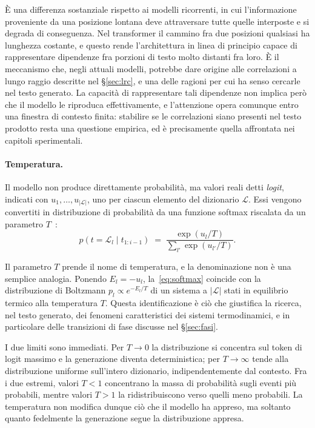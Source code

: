 È una differenza sostanziale rispetto ai modelli ricorrenti, in cui
l'informazione proveniente da una posizione lontana deve attraversare tutte
quelle interposte e si degrada di conseguenza. Nel transformer il cammino fra
due posizioni qualsiasi ha lunghezza costante, e questo rende l'architettura in
linea di principio capace di rappresentare dipendenze fra porzioni di testo
molto distanti fra loro. È il meccanismo che, negli attuali modelli, potrebbe
dare origine alle correlazioni a lungo raggio descritte nel §\ref{sec:lrc}, e
una delle ragioni per cui ha senso cercarle nel testo generato. La capacità di
rappresentare tali dipendenze non implica però che il modello le riproduca
effettivamente, e l'attenzione opera comunque entro una finestra di contesto
finita: stabilire se le correlazioni siano presenti nel
testo prodotto resta una questione empirica, ed è precisamente quella affrontata
nei capitoli sperimentali.

\paragraph{Temperatura.}
Il modello non produce direttamente probabilità, ma valori reali detti
\emph{logit}, indicati con $u_1,\dots,u_{|\mathcal{L}|}$, uno per ciascun
elemento del dizionario $\mathcal{L}$. Essi vengono convertiti in distribuzione
di probabilità da una funzione softmax riscalata da un parametro
$T$~\cite{ackley1985}:
\begin{equation}
  p(t = \mathcal{L}_l \mid t_{1:i-1}) \;=\;
  \frac{\exp(u_l / T)}{\sum_{l'} \exp(u_{l'} / T)} .
  \label{eq:softmax}
\end{equation}

Il parametro $T$ prende il nome di temperatura, e la denominazione non è una
semplice analogia. Ponendo $E_l = -u_l$, la~\eqref{eq:softmax} coincide con la
distribuzione di Boltzmann $p_l \propto e^{-E_l/T}$ di un sistema a
$|\mathcal{L}|$ stati in equilibrio termico alla temperatura $T$. Questa
identificazione è ciò che giustifica la ricerca, nel testo generato, dei
fenomeni caratteristici dei sistemi termodinamici, e in particolare delle
transizioni di fase discusse nel §\ref{sec:fasi}.

I due limiti sono immediati. Per $T\to0$ la distribuzione si concentra sul token
di logit massimo e la generazione diventa deterministica; per $T\to\infty$ tende
alla distribuzione uniforme sull'intero dizionario, indipendentemente dal
contesto. Fra i due estremi, valori $T<1$ concentrano la massa di probabilità
sugli eventi più probabili, mentre valori $T>1$ la ridistribuiscono verso quelli
meno probabili. La temperatura non modifica dunque ciò che il modello ha
appreso, ma soltanto quanto fedelmente la generazione segue la distribuzione
appresa.


